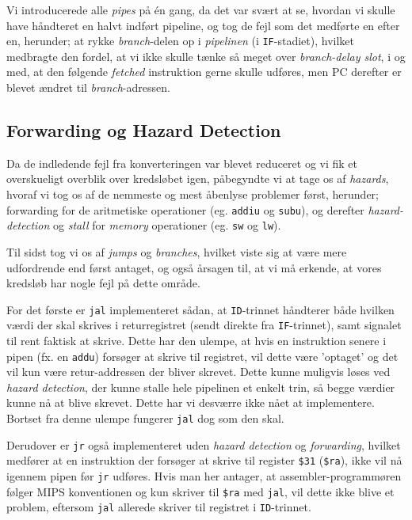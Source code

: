 \documentclass[11pt,twoside,a4paper]{article}
\begin{document}
Vi introducerede alle {\it pipes} på én gang, da det var svært at se, hvordan
vi skulle have håndteret en halvt indført pipeline, og tog de fejl som det
medførte en efter en, herunder; at rykke {\it branch}-delen op i
{\it pipelinen} (i {\tt IF}-stadiet), hvilket medbragte den fordel, at vi ikke
skulle tænke så meget over {\it branch-delay slot}, i og med, at den følgende
{\it fetched} instruktion gerne skulle udføres, men PC derefter er blevet
ændret til {\it branch}-adressen.

\subsection{Forwarding og Hazard Detection}
Da de indledende fejl fra konverteringen var blevet reduceret og vi fik et
overskueligt overblik over kredsløbet igen, påbegyndte vi at tage os af
{\it hazards}, hvoraf vi tog os af de nemmeste og mest åbenlyse problemer
først, herunder; forwarding for de aritmetiske operationer (eg. {\tt addiu}
og {\tt subu}), og derefter {\it hazard-detection} og {\it stall} for
{\it memory} operationer (eg. {\tt sw} og {\tt lw}).

Til sidst tog vi os af {\it jumps} og {\it branches}, hvilket viste sig at
være mere udfordrende end først antaget, og også årsagen til, at vi må
erkende, at vores kredsløb har nogle fejl på dette område.

For det første er {\tt jal} implementeret sådan, at {\tt ID}-trinnet
håndterer både hvilken værdi der skal skrives i returregistret (sendt direkte
fra {\tt IF}-trinnet), samt signalet til rent faktisk at skrive. Dette har
den ulempe, at hvis en instruktion senere i pipen (fx. en {\tt addu}) forsøger
at skrive til registret, vil dette være 'optaget' og det vil kun være
retur-addressen der bliver skrevet. Dette kunne muligvis løses ved {\it hazard
detection}, der kunne stalle hele pipelinen et enkelt trin, så begge værdier
kunne nå at blive skrevet. Dette har vi desværre ikke nået at implementere.
Bortset fra denne ulempe fungerer {\tt jal} dog som den skal.

Derudover er {\tt jr} også implementeret uden {\it hazard detection} og
{\it forwarding}, hvilket medfører at en instruktion der forsøger at skrive
til register {\tt \$31} ({\tt \$ra}), ikke vil nå igennem pipen før {\tt jr}
udføres. Hvis man her antager, at assembler-programmøren følger MIPS
konventionen og kun skriver til {\tt \$ra} med {\tt jal}, vil dette ikke
blive et problem, eftersom {\tt jal} allerede skriver til registret i
{\tt ID}-trinnet.
\end{document}
